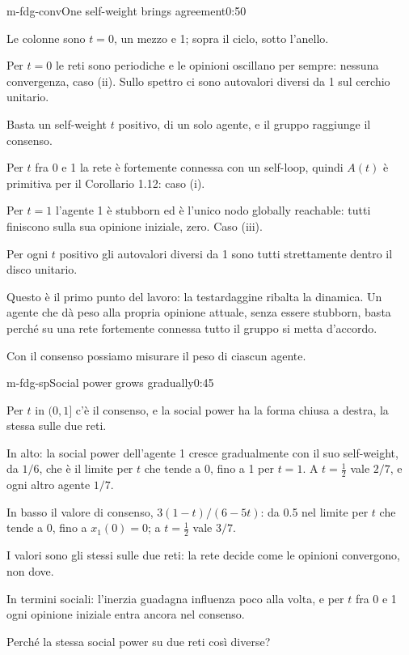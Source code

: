 \begin{slide}{m-fdg-conv}{One self-weight brings agreement}{0:50}
  \begin{discorso}
    \item Le colonne sono $t=0$, un mezzo e 1; sopra il ciclo, sotto l'anello.
    \item Per $t=0$ le reti sono periodiche e le opinioni oscillano per sempre: nessuna convergenza, caso (ii). Sullo spettro ci sono autovalori diversi da 1 sul cerchio unitario.
    \item Basta un self-weight $t$ positivo, di un solo agente, e il gruppo raggiunge il consenso.
    \item Per $t$ fra 0 e 1 la rete è fortemente connessa con un self-loop, quindi $A(t)$ è primitiva per il Corollario 1.12: caso (i).
    \item Per $t=1$ l'agente 1 è stubborn ed è l'unico nodo globally reachable: tutti finiscono sulla sua opinione iniziale, zero. Caso (iii).
    \item Per ogni $t$ positivo gli autovalori diversi da 1 sono tutti strettamente dentro il disco unitario.
    \item Questo è il primo punto del lavoro: la testardaggine ribalta la dinamica. Un agente che dà peso alla propria opinione attuale, senza essere stubborn, basta perché su una rete fortemente connessa tutto il gruppo si metta d'accordo.
    \item Con il consenso possiamo misurare il peso di ciascun agente.
  \end{discorso}
\end{slide}

\begin{slide}{m-fdg-sp}{Social power grows gradually}{0:45}
  \begin{discorso}
    \item Per $t$ in $(0,1]$ c'è il consenso, e la social power ha la forma chiusa a destra, la stessa sulle due reti.
    \item In alto: la social power dell'agente 1 cresce gradualmente con il suo self-weight, da $1/6$, che è il limite per $t$ che tende a 0, fino a 1 per $t=1$. A $t=\tfrac12$ vale $2/7$, e ogni altro agente $1/7$.
    \item In basso il valore di consenso, $3(1-t)/(6-5t)$: da 0.5 nel limite per $t$ che tende a 0, fino a $x_1(0)=0$; a $t=\tfrac12$ vale $3/7$.
    \item I valori sono gli stessi sulle due reti: la rete decide come le opinioni convergono, non dove.
    \item In termini sociali: l'inerzia guadagna influenza poco alla volta, e per $t$ fra 0 e 1 ogni opinione iniziale entra ancora nel consenso.
    \item Perché la stessa social power su due reti così diverse?
  \end{discorso}
\end{slide}

